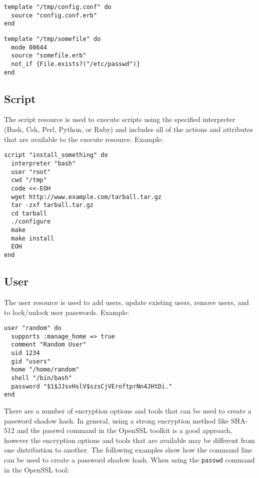 \begin{lstlisting}[label=lst:cookbook-resources-cookbook-template1]
template "/tmp/config.conf" do
  source "config.conf.erb"
end
\end{lstlisting}

\begin{lstlisting}[label=lst:cookbook-resources-cookbook-template2]
template "/tmp/somefile" do
  mode 00644
  source "somefile.erb"
  not_if {File.exists?("/etc/passwd")}
end
\end{lstlisting}

\subsection{Script}

The script resource is used to execute scripts using the specified interpreter (Bash, Csh, Perl, Python, or Ruby) and includes all of the actions and attributes that are available to the execute resource. Example:

\begin{lstlisting}[label=lst:cookbook-resources-cookbook-script1]
script "install_something" do
  interpreter "bash"
  user "root"
  cwd "/tmp"
  code <<-EOH
  wget http://www.example.com/tarball.tar.gz
  tar -zxf tarball.tar.gz
  cd tarball
  ./configure
  make
  make install
  EOH
end
\end{lstlisting}

\subsection{User}

The user resource is used to add users, update existing users, remove users, and to lock/unlock user passwords. Example:

\begin{lstlisting}[label=lst:cookbook-resources-cookbook-user1]
user "random" do
  supports :manage_home => true
  comment "Random User"
  uid 1234
  gid "users"
  home "/home/random"
  shell "/bin/bash"
  password "$1$JJsvHslV$szsCjVEroftprNn4JHtDi."
end
\end{lstlisting}

There are a number of encryption options and tools that can be used to create a password shadow hash. In general, using a strong encryption method like SHA-512 and the passwd command in the OpenSSL toolkit is a good approach, however the encryption options and tools that are available may be different from one distribution to another. The following examples show how the command line can be used to create a password shadow hash. When using the \lstinline!passwd! command in the OpenSSL tool:

